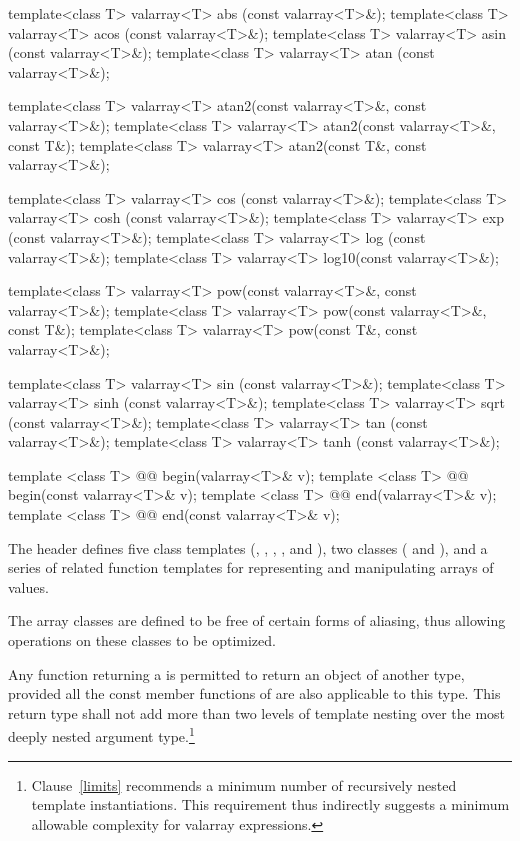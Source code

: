 \begin{codeblock}
{  template<class T> valarray<T> abs  (const valarray<T>&);
  template<class T> valarray<T> acos (const valarray<T>&);
  template<class T> valarray<T> asin (const valarray<T>&);
  template<class T> valarray<T> atan (const valarray<T>&);

  template<class T> valarray<T> atan2(const valarray<T>&, const valarray<T>&);
  template<class T> valarray<T> atan2(const valarray<T>&, const T&);
  template<class T> valarray<T> atan2(const T&, const valarray<T>&);

  template<class T> valarray<T> cos  (const valarray<T>&);
  template<class T> valarray<T> cosh (const valarray<T>&);
  template<class T> valarray<T> exp  (const valarray<T>&);
  template<class T> valarray<T> log  (const valarray<T>&);
  template<class T> valarray<T> log10(const valarray<T>&);

  template<class T> valarray<T> pow(const valarray<T>&, const valarray<T>&);
  template<class T> valarray<T> pow(const valarray<T>&, const T&);
  template<class T> valarray<T> pow(const T&, const valarray<T>&);

  template<class T> valarray<T> sin  (const valarray<T>&);
  template<class T> valarray<T> sinh (const valarray<T>&);
  template<class T> valarray<T> sqrt (const valarray<T>&);
  template<class T> valarray<T> tan  (const valarray<T>&);
  template<class T> valarray<T> tanh (const valarray<T>&);

  template <class T> @@ begin(valarray<T>& v);
  template <class T> @@ begin(const valarray<T>& v);
  template <class T> @@ end(valarray<T>& v);
  template <class T> @@ end(const valarray<T>& v);
}
\end{codeblock}

\pnum
The header
defines five
class templates
(,
,
,
,
and
),
two classes (
and
),
and a series of related
function templates
for representing
and manipulating arrays of values.

\pnum
The
array classes
are defined to be free of certain forms of aliasing, thus allowing
operations on these classes to be optimized.

\pnum
Any function returning a
is permitted to return an object of another type, provided all the
const member functions of
are also applicable to this type.
This return type shall not add
more than two levels of template nesting over the most deeply nested
argument type.\footnote{Clause~\ref{limits} recommends a minimum number
of recursively nested template
instantiations.
This requirement thus indirectly suggests a minimum
allowable complexity for valarray expressions.}

